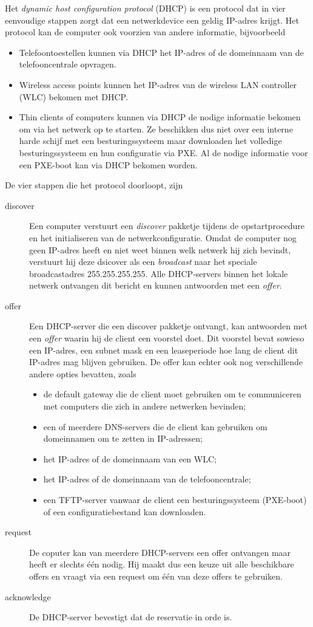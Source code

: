 Het \emph{dynamic host configuration protocol} (DHCP) is een protocol dat in vier eenvoudige stappen zorgt dat een netwerkdevice een geldig IP-adres krijgt.
Het protocol kan de computer ook voorzien van andere informatie, bijvoorbeeld
\begin{itemize}
\item
   Telefoontoestellen kunnen via DHCP het IP-adres of de domeinnaam van de telefooncentrale opvragen.
\item
   Wireless access points kunnen het IP-adres van de wireless LAN controller (WLC) bekomen met DHCP.
\item
   Thin clients of computers kunnen via DHCP de nodige informatie bekomen om via het netwerk op te starten.
   Ze beschikken dus niet over een interne harde schijf met een besturingssysteem maar downloaden het volledige besturingssysteem en hun configuratie via PXE.
   Al de nodige informatie voor een PXE-boot kan via DHCP bekomen worden.
\end{itemize}

De vier stappen die het protocol doorloopt, zijn
\begin{description}
\item[discover]
   Een computer verstuurt een \emph{discover} pakketje tijdens de opstartprocedure en het initialiseren van de netwerkconfiguratie.
   Omdat de computer nog geen IP-adres heeft en niet weet binnen welk netwerk hij zich bevindt, verstuurt hij deze dsicover als een \emph{broadcast} naar het speciale broadcastadres 255.255.255.255.
   Alle DHCP-servers binnen het lokale netwerk ontvangen dit bericht en kunnen antwoorden met een \emph{offer}.
\item[offer]
   Een DHCP-server die een discover pakketje ontvangt, kan antwoorden met een \emph{offer} waarin hij de client een voorstel doet.
   Dit voorstel bevat sowieso een IP-adres, een subnet mask en een leaseperiode hoe lang de client dit IP-adres mag blijven gebruiken.
   De offer kan echter ook nog verschillende andere opties bevatten, zoals
   \begin{itemize}
   \item de default gateway die de client moet gebruiken om te communiceren met computers die zich in andere netwerken bevinden;
   \item een of meerdere DNS-servers die de client kan gebruiken om domeinnamen om te zetten in IP-adressen;
   \item het IP-adres of de domeinnaam van een WLC;
   \item het IP-adres of de domeinnaam van de telefooncentrale;
   \item een TFTP-server vanwaar de client een besturingssysteem (PXE-boot) of een configuratiebestand kan downloaden.
   \end{itemize}
\item[request]
   De coputer kan van meerdere DHCP-servers een offer ontvangen maar heeft er slechts één nodig.
   Hij maakt dus een keuze uit alle beschikbare offers en vraagt via een request om één van deze offers te gebruiken.
\item[acknowledge]
   De DHCP-server bevestigt dat de reservatie in orde is.
\end{description}

